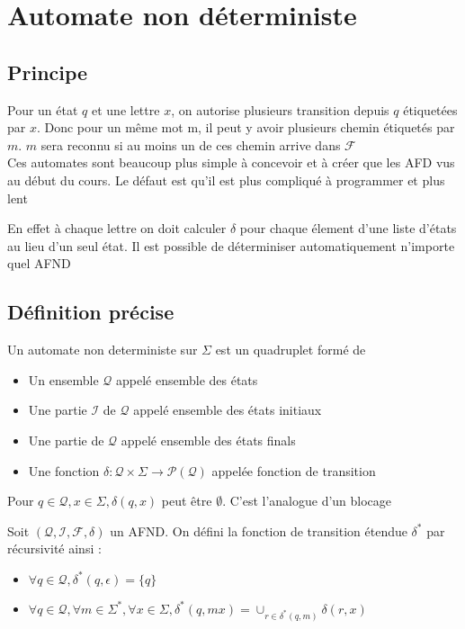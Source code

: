 \section{Automate non déterministe}
\subsection{Principe}

Pour un état $q$ et une lettre $x$, on autorise plusieurs transition depuis $q$ étiquetées par $x$.
Donc pour un même mot m, il peut y avoir plusieurs chemin étiquetés par $m$. $m$ sera reconnu si au moins un de ces
chemin arrive dans $\mathcal{F}$\\

Ces automates sont beaucoup plus simple à concevoir et à créer que les AFD vus au début du cours. Le défaut est qu'il est
plus compliqué à programmer et plus lent

En effet à chaque lettre on doit calculer $\delta$ pour chaque élement d'une liste d'états au lieu d'un seul état.
Il est possible de déterminiser automatiquement n'importe quel AFND

\subsection{Définition précise}

\begin{definition}
    Un automate non deterministe sur $\Sigma$ est un quadruplet formé de
    \begin{itemize}
        \item Un ensemble $\mathcal{Q}$ appelé ensemble des états
        \item Une partie $\mathcal{I}$ de $\mathcal{Q}$ appelé ensemble des états initiaux
        \item Une partie de $\mathcal{Q}$ appelé ensemble des états finals
        \item Une fonction $\delta : \mathcal{Q}\times\Sigma \longrightarrow \mathcal{P}(\mathcal{Q})$ appelée fonction de transition 
    \end{itemize}
\end{definition}

\begin{remark}
    Pour $q\in \mathcal{Q},x\in\Sigma, \delta(q,x)$ peut être $\emptyset$. C'est l'analogue d'un blocage 
\end{remark}

\begin{definition}
    Soit $(\mathcal{Q},\mathcal{I},\mathcal{F},\delta)$ un AFND. On défini la fonction de transition étendue $\delta^*$ 
    par récursivité ainsi :
    \begin{itemize}
        \item $\forall q \in \mathcal{Q}, \delta^*(q,\epsilon)=\{q\}$
        \item $\forall q \in \mathcal{Q}, \forall m \in \Sigma^*, \forall x \in \Sigma, \delta^*(q,mx)=\cup_{r\in \delta^*(q,m)}\delta(r,x)$
    \end{itemize}
\end{definition}

